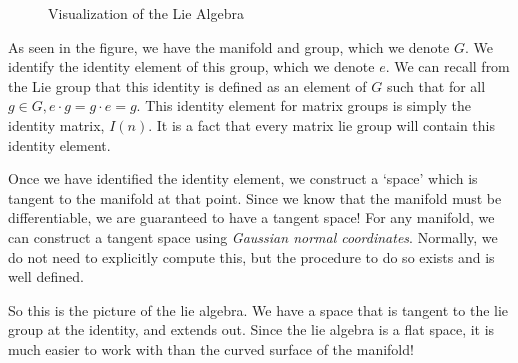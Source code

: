 \begin{figure}[ht]

    \caption{Visualization of the Lie Algebra}
    \label{fig:Lie Algebra}
\end{figure}
As seen in the figure, we have the manifold and group, which we denote $G$. We identify the identity element of this group, which we denote $e$. We can recall from the Lie group that this identity is defined as an element of $G$ such that for all  $g \in G, e\cdot g=g\cdot e=g$. This identity element for matrix groups is simply the identity matrix, $I(n)$. It is a fact that every matrix \gls{lie group} will contain this identity element.

Once we have identified the identity element, we construct a `space' which is tangent to the manifold at that point. Since we know that the manifold must be differentiable, we are guaranteed to have a tangent space! For any manifold, we can construct a tangent space using \textit{Gaussian normal coordinates}. Normally, we do not need to explicitly compute this, but the procedure to do so exists and is well defined.

So this is the picture of the \gls{lie algebra}. We have a space that is tangent to the \gls{lie group} at the identity, and extends out. Since the \gls{lie algebra} is a flat space, it is much easier to work with than the curved surface of the manifold!

